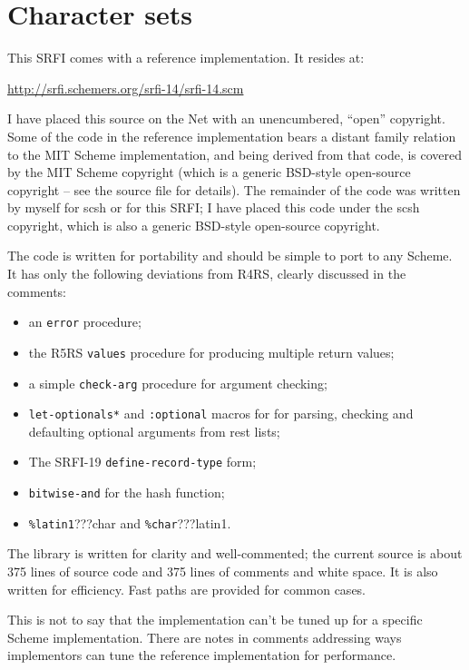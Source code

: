 \section{Character sets}

This SRFI comes with a reference implementation. It resides at:

\url{http://srfi.schemers.org/srfi-14/srfi-14.scm}

I have placed this source on the Net with an unencumbered, ``open''
copyright. Some of the code in the reference implementation bears a
distant family relation to the MIT Scheme implementation, and being
derived from that code, is covered by the MIT Scheme copyright (which is
a generic BSD-style open-source copyright -- see the source file for
details). The remainder of the code was written by myself for scsh or
for this SRFI; I have placed this code under the scsh copyright, which
is also a generic BSD-style open-source copyright.

The code is written for portability and should be simple to port to any
Scheme. It has only the following deviations from R4RS, clearly
discussed in the comments:

\begin{itemize}
\tightlist
\item
  an \texttt{error} procedure;
\item
  the R5RS \texttt{values} procedure for producing multiple return
  values;
\item
  a simple \texttt{check-arg} procedure for argument checking;
\item
  \texttt{let-optionals*} and \texttt{:optional} macros for for parsing,
  checking and defaulting optional arguments from rest lists;
\item
  The SRFI-19 \texttt{define-record-type} form;
\item
  \texttt{bitwise-and} for the hash function;
\item
  \texttt{\%latin1}{???}{char} and
  \texttt{\%char}{???}{latin1}.
\end{itemize}

The library is written for clarity and well-commented; the current
source is about 375 lines of source code and 375 lines of comments and
white space. It is also written for efficiency. Fast paths are provided
for common cases.

This is not to say that the implementation can't be tuned up for a
specific Scheme implementation. There are notes in comments addressing
ways implementors can tune the reference implementation for performance.

